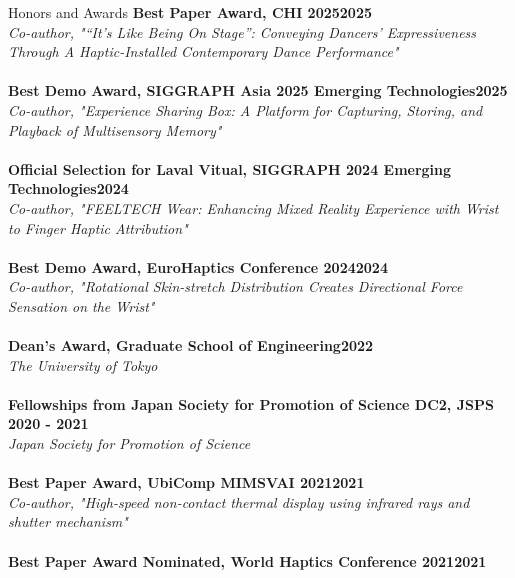 \documentclass{resume} %
\begin{document}
\begin{rSection}{Honors and Awards}
{\bf Best Paper Award, CHI 2025}\hfill {\bf 2025}
\\{\em Co-author, "“It’s Like Being On Stage”: Conveying Dancers’ Expressiveness Through A Haptic-Installed Contemporary Dance Performance"} \\
\\{\bf Best Demo Award, SIGGRAPH Asia 2025 Emerging Technologies}\hfill {\bf 2025}
\\{\em Co-author, "Experience Sharing Box: A Platform for Capturing, Storing, and Playback of Multisensory Memory"} \\
\\{\bf Official Selection for Laval Vitual, SIGGRAPH 2024 Emerging Technologies}\hfill {\bf 2024}
\\{\em Co-author, "FEELTECH Wear: Enhancing Mixed Reality Experience with Wrist to Finger Haptic Attribution"} \\
\\{\bf Best Demo Award, EuroHaptics Conference 2024}\hfill {\bf 2024}
\\{\em Co-author, "Rotational Skin-stretch Distribution Creates Directional Force Sensation on the Wrist"} \\
\\{\bf Dean's Award, Graduate School of Engineering}\hfill {\bf 2022}
\\{\em The University of Tokyo} \\
\\{\bf Fellowships from Japan Society for Promotion of Science DC2, JSPS} \hfill {\bf 2020 - 2021}
\\{\em Japan Society for Promotion of Science} \\
\vspace{-3mm}
\\{\bf Best Paper Award, UbiComp MIMSVAI 2021}\hfill {\bf 2021}
\\{\em Co-author, "High-speed non-contact thermal display using infrared rays and shutter mechanism"} \\
\\{\bf Best Paper Award Nominated, World Haptics Conference 2021}\hfill {\bf 2021}

\end{rSection}
\end{document}
